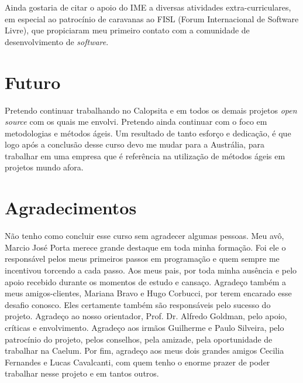 \documentclass[titlepage,a4paper]{article}
\newcommand{\opensource}{\textit{open source}}
\newcommand{\software}{\textit{software}}
\newcommand{\calopsita}{Calopsita}
\begin{document}
Ainda gostaria de citar o apoio do IME a diversas atividades extra-curriculares, em especial ao patrocínio de caravanas ao FISL (Forum Internacional de Software Livre), que propiciaram meu primeiro contato com a comunidade de desenvolvimento de \software{}.

\section{Futuro}

Pretendo continuar trabalhando no \calopsita{} e em todos os demais projetos \opensource{} com os quais me envolvi. Pretendo ainda continuar com o foco em metodologias e métodos ágeis. Um resultado de tanto esforço e dedicação, é que logo após a conclusão desse curso devo me mudar para a Austrália, para trabalhar em uma empresa que é referência na utilização de métodos ágeis em projetos mundo afora.

\section{Agradecimentos}
Não tenho como concluir esse curso sem agradecer algumas pessoas. Meu avô, Marcio José Porta merece grande destaque em toda minha formação. Foi ele o responsável pelos meus primeiros passos em programação e quem sempre me incentivou torcendo a cada passo. Aos meus pais, por toda minha ausência e pelo apoio recebido durante os momentos de estudo e cansaço. Agradeço também a meus amigos-clientes, Mariana Bravo e Hugo Corbucci, por terem encarado esse desafio conosco. Eles certamente também são responsáveis pelo sucesso do projeto. Agradeço ao nosso orientador, Prof. Dr. Alfredo Goldman, pelo apoio, críticas e envolvimento. Agradeço aos irmãos Guilherme e Paulo Silveira, pelo patrocínio do projeto, pelos conselhos, pela amizade, pela oportunidade de trabalhar na Caelum. Por fim, agradeço aos meus dois grandes amigos Cecilia Fernandes e Lucas Cavalcanti, com quem tenho o enorme prazer de poder trabalhar nesse projeto e em tantos outros.
\end{document}
